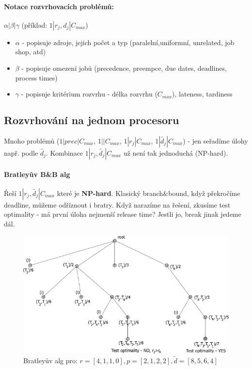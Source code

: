 \paragraph{Notace rozvrhovacích problémů:} $\alpha | \beta | \gamma$ (příklad: $1|r_j,d_j|C_{max}$)
\begin{itemize}
\item $\alpha$ - popisuje zdroje, jejich počet a typ (paralelní,uniformní, unrelated, job shop, atd)
\item $\beta$ - popisuje omezení jobů (precedence, preempce, due dates, deadlines, process times)
\item $\gamma$ - popisuje kritérium rozvrhu - délka rozvrhu ($C_{max}$), lateness, tardiness
\end{itemize}

\subsection{Rozvrhování na jednom procesoru}
Mnoho  problémů ($1|prec|C_{max}$, $1||C_{max}$, $1|r_j|C_{max}$, $1|\widetilde{d_j}|C_{max}$) - jen seřadíme úlohy např. podle $\widetilde{d_j}$. Kombinace $1|r_j,\widetilde{d_j}|C_{max}$ už není tak jednoduchá (NP-hard).

\paragraph{Bratleyův B\&B alg} Řeší \textbf{$1|r_j,\widetilde{d_j}|C_{max}$} které je \textbf{NP-hard}. Klasický branch\&bound, když překročíme deadline, můžeme odříznout i bratry. Když narazíme na řešení, zkusíme test optimality - má první úloha nejmenší release time? Jestli jo, break jinak jedeme dál.

\begin{figure}[h]
    \begin{center}
        \includegraphics[width=130mm]{spolecne/10/images/bratley}
    \end{center}
    \caption{Bratleyův alg pro: $r=[4,1,1,0], p=[2,1,2,2], \widetilde{d}=[8,5,6,4]$}
\end{figure}

